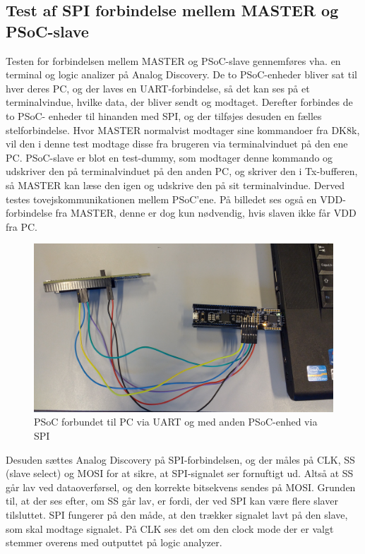 \subsection{Test af SPI forbindelse mellem MASTER og PSoC-slave}

Testen for forbindelsen mellem MASTER og PSoC-slave gennemføres vha. en terminal og logic analizer på Analog Discovery. De to PSoC-enheder bliver sat 
til hver deres PC, og der laves en UART-forbindelse, så det kan ses på et terminalvindue, hvilke data, der bliver sendt og modtaget. Derefter forbindes de to PSoC-
enheder til hinanden med SPI, og der tilføjes desuden en fælles stelforbindelse. Hvor MASTER normalvist modtager sine kommandoer fra DK8k, vil den i denne test
modtage disse fra brugeren via terminalvinduet på den ene PC. PSoC-slave er blot en test-dummy, som modtager denne kommando og udskriver den på terminalvinduet
på den anden PC, og skriver den i Tx-bufferen, så MASTER kan læse den igen og udskrive den på sit terminalvindue. Derved testes tovejskommunikationen mellem PSoC'ene.
På billedet ses også en VDD-forbindelse fra MASTER, denne er dog kun nødvendig, hvis slaven ikke får VDD fra PC.
 
\begin{figure}[H]
	\centering
\includegraphics[scale=0.1]{Screenshots/SPI_testopstilling}
\caption{PSoC forbundet til PC via UART og med anden PSoC-enhed via SPI}
\end{figure}

Desuden sættes Analog Discovery på SPI-forbindelsen, og der måles på CLK, SS (slave select) og MOSI for at sikre, at SPI-signalet ser fornuftigt ud. Altså at SS 
går lav ved dataoverførsel, og den korrekte bitsekvens sendes på MOSI. Grunden til, at der ses efter, om SS går lav, er fordi, der ved SPI kan være flere slaver 
tilsluttet. SPI fungerer på den måde, at den trækker signalet lavt på den slave, som skal modtage signalet.
På CLK ses det om den clock mode der er valgt stemmer overens med outputtet på logic analyzer.

